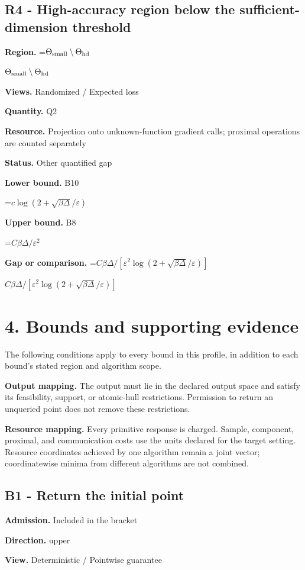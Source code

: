\documentclass[10pt,a4paper]{article}
\newcommand{\AtlasMath}[1]{\par\begingroup\centering\setbox0=\hbox{$\displaystyle #1$}\ifdim\wd0>1.4\linewidth\typeout{ATLAS WIDE FORMULA: \the\wd0}\fi\ifdim\wd0>\linewidth\resizebox{\linewidth}{!}{\box0}\else\box0\fi\par\endgroup}
\newcommand{\AtlasInlineMath}[1]{\begingroup\setbox0=\hbox{$#1$}\ifdim\wd0>.4\linewidth\endgroup\AtlasMath{#1}\else\endgroup$#1$\fi}
\begin{document}
\subsection{R4 - High-accuracy region below the sufficient-dimension threshold}
\textbf{Region.} \AtlasInlineMath{\Theta_{\rm small}\setminus\Theta_{\rm hd}}

\textbf{Views.} Randomized / Expected loss

\textbf{Quantity.} Q2

\textbf{Resource.} Projection onto unknown-function gradient calls; proximal operations are counted separately

\textbf{Status.} Other quantified gap

\textbf{Lower bound.} B10

\AtlasMath{c\log(2+\sqrt{\beta\Delta}/\varepsilon)}
\textbf{Upper bound.} B8

\AtlasMath{C\beta\Delta/\varepsilon^2}
\textbf{Gap or comparison.} \AtlasInlineMath{C\beta\Delta/[\varepsilon^2\log(2+\sqrt{\beta\Delta}/\varepsilon)]}

\section{4. Bounds and supporting evidence}
The following conditions apply to every bound in this profile, in addition to each bound's stated region and algorithm scope.

\textbf{Output mapping.} The output must lie in the declared output space and satisfy its feasibility, support, or atomic-hull restrictions. Permission to return an unqueried point does not remove these restrictions.

\textbf{Resource mapping.} Every primitive response is charged. Sample, component, proximal, and communication costs use the units declared for the target setting. Resource coordinates achieved by one algorithm remain a joint vector; coordinatewise minima from different algorithms are not combined.

\subsection{B1 - Return the initial point}
\textbf{Admission.} Included in the bracket

\textbf{Direction.} upper

\textbf{View.} Deterministic / Pointwise guarantee
\end{document}
